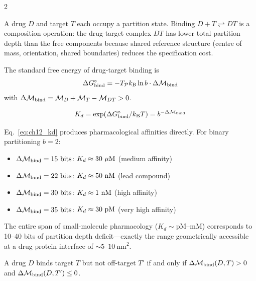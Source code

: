 \begin{multicols}{2}

A drug $D$ and target $T$ each occupy a partition state. Binding $D + T \rightleftharpoons DT$ is a composition operation: the drug-target complex $DT$ has lower total partition depth than the free components because shared reference structure (centre of mass, orientation, shared boundaries) reduces the specification cost.

\begin{theorem}
\label{thm:ch12_binding}
The standard free energy of drug-target binding is
\begin{equation}
\Delta G^\circ_{\mathrm{bind}} = -T_{\mathcal{P}}k_{\mathrm{B}}\ln b\cdot\Delta\mathcal{M}_{\mathrm{bind}}
\label{eq:ch12_binding_energy}
\end{equation}
with $\Delta\mathcal{M}_{\mathrm{bind}} = \mathcal{M}_D + \mathcal{M}_T - \mathcal{M}_{DT} > 0$.
\end{theorem}

\begin{corollary}
\label{cor:ch12_kd}
\begin{equation}
K_d = \exp\!\left(\Delta G^\circ_{\mathrm{bind}}/k_{\mathrm{B}} T\right) = b^{-\Delta\mathcal{M}_{\mathrm{bind}}}
\label{eq:ch12_kd}
\end{equation}
\end{corollary}

Eq.~\ref{eq:ch12_kd} produces pharmacological affinities directly. For binary partitioning $b = 2$:
\begin{itemize}
\item $\DeltaDepth_{\mathrm{bind}} = 15\ \mathrm{bits}$: $\Kd \approx 30\ \mu\mathrm{M}$ (medium affinity)
\item $\DeltaDepth_{\mathrm{bind}} = 22\ \mathrm{bits}$: $\Kd \approx 50\ \mathrm{nM}$ (lead compound)
\item $\DeltaDepth_{\mathrm{bind}} = 30\ \mathrm{bits}$: $\Kd \approx 1\ \mathrm{nM}$ (high affinity)
\item $\DeltaDepth_{\mathrm{bind}} = 35\ \mathrm{bits}$: $\Kd \approx 30\ \mathrm{pM}$ (very high affinity)
\end{itemize}
The entire span of small-molecule pharmacology ($K_d \sim \mathrm{pM}$--mM) corresponds to 10--40 bits of partition depth deficit---exactly the range geometrically accessible at a drug-protein interface of $\sim 5$--$10\ \mathrm{nm}^2$.

\begin{proposition}
\label{prop:ch12_specificity}
A drug $D$ binds target $T$ but not off-target $T'$ if and only if $\Delta\mathcal{M}_{\mathrm{bind}}(D, T) > 0$ and $\Delta\mathcal{M}_{\mathrm{bind}}(D, T') \leq 0$.
\end{proposition}


\end{multicols}
